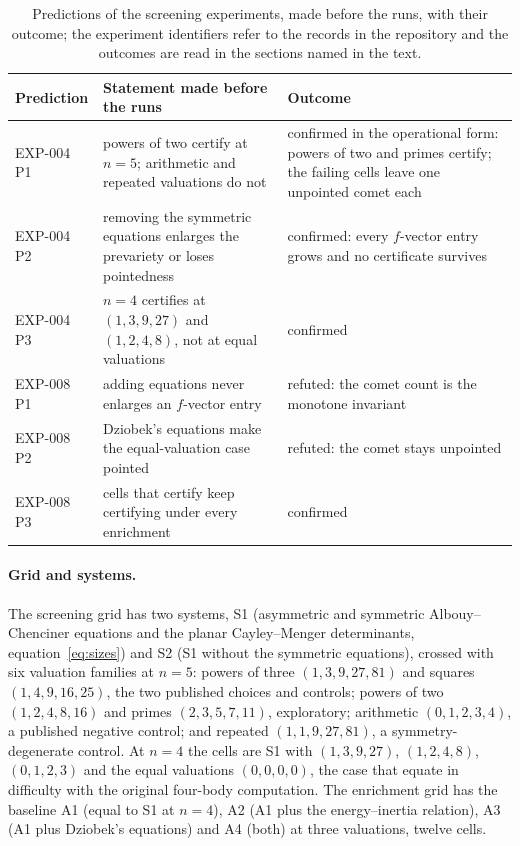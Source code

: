\documentclass[11pt]{article}
\theoremstyle{definition}
\theoremstyle{remark}
\begin{document}
\begin{table}[t]\centering\footnotesize
\begin{tabular}{@{}L{1.5cm}L{5.0cm}L{5.2cm}@{}}
\toprule
Prediction & Statement made before the runs & Outcome \\
\midrule
EXP-004 P1 & powers of two certify at $n=5$; arithmetic and repeated valuations do not & confirmed in the operational form: powers of two and primes certify; the failing cells leave one unpointed comet each \\
EXP-004 P2 & removing the symmetric equations enlarges the prevariety or loses pointedness & confirmed: every $f$-vector entry grows and no certificate survives \\
EXP-004 P3 & $n=4$ certifies at $(1,3,9,27)$ and $(1,2,4,8)$, not at equal valuations & confirmed \\
EXP-008 P1 & adding equations never enlarges an $f$-vector entry & refuted: the comet count is the monotone invariant \\
EXP-008 P2 & Dziobek's equations make the equal-valuation case pointed & refuted: the comet stays unpointed \\
EXP-008 P3 & cells that certify keep certifying under every enrichment & confirmed \\
\bottomrule
\end{tabular}
\caption{Predictions of the screening experiments, made before the runs, with their outcome; the experiment identifiers refer to the
records in the repository and the outcomes are read in the sections named in the text.}\label{tab:predictions}
\end{table}

\paragraph{Grid and systems.}
The screening grid has two systems, S1 (asymmetric and symmetric Albouy--Chenciner equations and the planar Cayley--Menger determinants,
equation~\eqref{eq:sizes}) and S2 (S1 without the symmetric equations), crossed with six valuation families at $n=5$: powers of three
$(1,3,9,27,81)$ and squares $(1,4,9,16,25)$, the two published choices and controls; powers of two $(1,2,4,8,16)$ and primes $(2,3,5,7,11)$,
exploratory; arithmetic $(0,1,2,3,4)$, a published negative control; and repeated $(1,1,9,27,81)$, a symmetry-degenerate control. At $n=4$ the cells
are S1 with $(1,3,9,27)$, $(1,2,4,8)$, $(0,1,2,3)$ and the equal valuations $(0,0,0,0)$, the case that
\cite{JL25} equate in difficulty with the original four-body computation. The enrichment grid has the baseline A1 (equal to S1 at $n=4$), A2 (A1 plus the
energy--inertia relation), A3 (A1 plus Dziobek's equations) and A4 (both) at three valuations, twelve cells.
\end{document}
